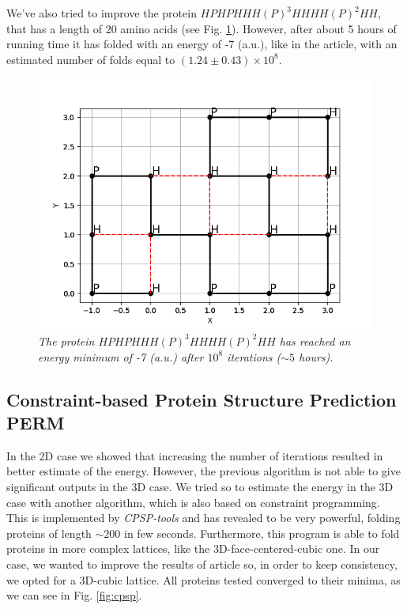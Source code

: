 We've also tried to improve the protein $HPHPHHH(P)^3HHHH(P)^2HH$, that has a length of 20 amino acids (see Fig. \ref{fig:18_2}).
However, after about 5 hours of running time it has folded with an energy of -7 (a.u.), like in the article, with an estimated number of folds equal to $(1.24 \pm 0.43) \times 10^8$.
\begin{figure}[H]
    \centering
    \includegraphics[width=.75\textwidth]{./img/18_2.png}
    \caption{\emph{The protein $HPHPHHH(P)^3HHHH(P)^2HH$ has reached an energy minimum of -7 (a.u.) after $10^8$ iterations ($\sim 5$ hours).}}
    \label{fig:18_2}
\end{figure}

\subsection{Constraint-based Protein Structure Prediction PERM}
In the 2D case we showed that increasing the number of iterations resulted in better estimate of the energy.
However, the previous algorithm is not able to give significant outputs in the 3D case.
We tried so to estimate the energy in the 3D case with another algorithm, which is also based on constraint programming.
This is implemented by \emph{CPSP-tools} \cite{cpsp} and has revealed to be very powerful, folding proteins of length $\sim 200$ in few seconds.
Furthermore, this program is able to fold proteins in more complex lattices, like the 3D-face-centered-cubic one.
In our case, we wanted to improve the results of article \cite{PERM} so, in order to keep consistency, we opted for a 3D-cubic lattice.
All proteins tested converged to their minima, as we can see in Fig. \ref{fig:cpsp}.

